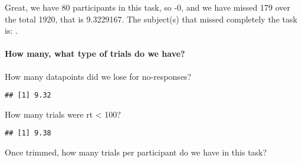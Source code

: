 \documentclass[
]{article}
\newenvironment{Shaded}{\begin{snugshade}}{\end{snugshade}}
\newcommand{\DecValTok}[1]{\textcolor[rgb]{0.00,0.00,0.81}{#1}}
\newcommand{\KeywordTok}[1]{\textcolor[rgb]{0.13,0.29,0.53}{\textbf{#1}}}
\newcommand{\NormalTok}[1]{#1}
\newcommand{\OperatorTok}[1]{\textcolor[rgb]{0.81,0.36,0.00}{\textbf{#1}}}
\newcommand{\StringTok}[1]{\textcolor[rgb]{0.31,0.60,0.02}{#1}}
\begin{document}
Great, we have 80 participants in this task, so -0, and we have missed
179 over the total 1920, that is 9.3229167. The subject(s) that missed
completely the task is: .

\hypertarget{how-many-what-type-of-trials-do-we-have-1}{%
\paragraph{How many, what type of trials do we
have?}\label{how-many-what-type-of-trials-do-we-have-1}}

How many datapoints did we lose for no-responses?

\begin{Shaded}
\end{Shaded}

\begin{verbatim}
## [1] 9.32
\end{verbatim}

How many trials were rt \textless{} 100?

\begin{Shaded}
\end{Shaded}

\begin{verbatim}
## [1] 9.38
\end{verbatim}

Once trimmed, how many trials per participant do we have in this task?

\begin{Shaded}
\end{Shaded}
\end{document}
